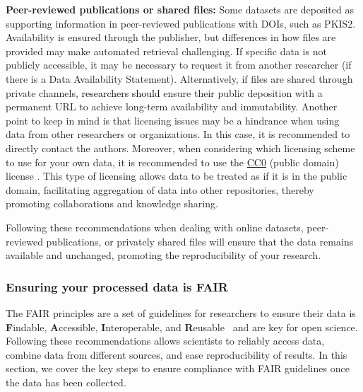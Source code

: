 \documentclass[9pt,lessons, pubversion]{livecoms}
\newcommand{\revision}[1]{\textcolor{black}{#1}}
\begin{document}
\textbf{Peer-reviewed publications or shared files:} 
Some datasets are deposited as supporting information in peer-reviewed publications with DOIs, such as PKIS2.~\cite{drewry2017progress} 
Availability is ensured through the publisher, but differences in how files are provided may make automated retrieval challenging. 
If specific data is not publicly accessible, it may be necessary to request it from another researcher (if there is a Data Availability Statement). 
Alternatively, if files are shared through private channels, \revision{researchers should} ensure their public deposition with a permanent URL to achieve long-term availability and immutability.  
Another point to keep in mind is that licensing issues may be a hindrance when using data from other researchers or organizations. 
In this case, it is recommended to directly contact the authors. Moreover, when considering which licensing scheme to use for your own data, it is recommended to use the \href{https://creativecommons.org/public-domain/cc0/}{CC0} (public domain) license \cite{labastida2020licensing}. This type of licensing allows data to be treated as if it is in the public domain, facilitating aggregation of data into other repositories, thereby promoting collaborations and knowledge sharing. 

Following these recommendations when dealing with online datasets, peer-reviewed publications, or privately shared files will ensure that the data remains available and unchanged, promoting the reproducibility of your research.




\subsubsection{Ensuring your processed data is FAIR}

The FAIR principles are a set of guidelines for researchers to ensure their data is \textbf{F}indable, \textbf{A}ccessible, \textbf{I}nteroperable, and \textbf{R}eusable~\cite{wilkinson2016fair} and are key for open science. 
Following these recommendations allows scientists to reliably access data, combine data from different sources, and ease reproducibility of results.  
In this section, we cover the key steps to ensure compliance with FAIR guidelines once the data has been collected.
\end{document}
